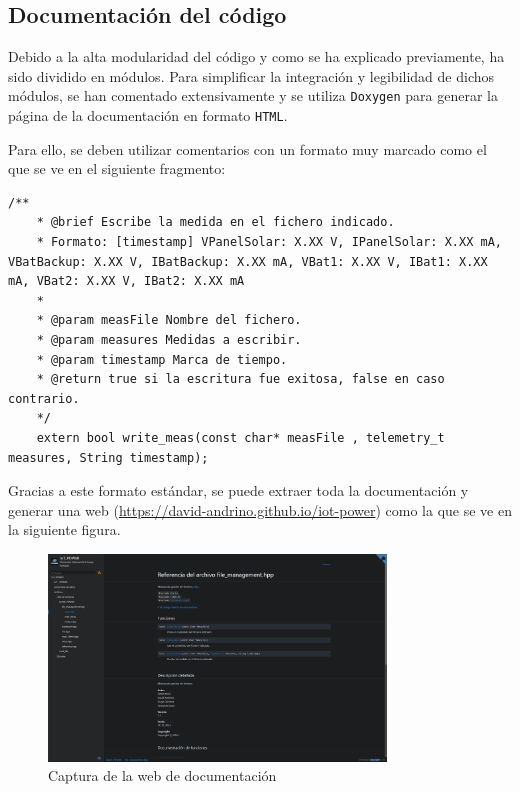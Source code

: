 \subsection{Documentación del código}

Debido a la alta modularidad del código y como se ha explicado previamente, ha sido dividido en módulos. Para simplificar la integración y legibilidad de dichos módulos, se han comentado extensivamente y se utiliza \texttt{Doxygen} para generar la página de la documentación en formato \texttt{HTML}.

Para ello, se deben utilizar comentarios con un formato muy marcado como el que se ve en el siguiente fragmento:

\begin{lstlisting}[caption={Ejemplo de comentario \texttt{Doxygen}},captionpos=b]
    /**
    * @brief Escribe la medida en el fichero indicado.
    * Formato: [timestamp] VPanelSolar: X.XX V, IPanelSolar: X.XX mA, VBatBackup: X.XX V, IBatBackup: X.XX mA, VBat1: X.XX V, IBat1: X.XX mA, VBat2: X.XX V, IBat2: X.XX mA
    * 
    * @param measFile Nombre del fichero.
    * @param measures Medidas a escribir.
    * @param timestamp Marca de tiempo.
    * @return true si la escritura fue exitosa, false en caso contrario.
    */
    extern bool write_meas(const char* measFile , telemetry_t measures, String timestamp);
\end{lstlisting}

Gracias a este formato estándar, se puede extraer toda la documentación y generar una web ({\url{https://david-andrino.github.io/iot-power}}) como la que se ve en la siguiente figura.

\begin{figure}[H]
    \centering
    \includegraphics[width=0.8\textwidth]{images/3-software/3-5-doxygen/web.png}
    \caption{Captura de la web de documentación}
\end{figure}

